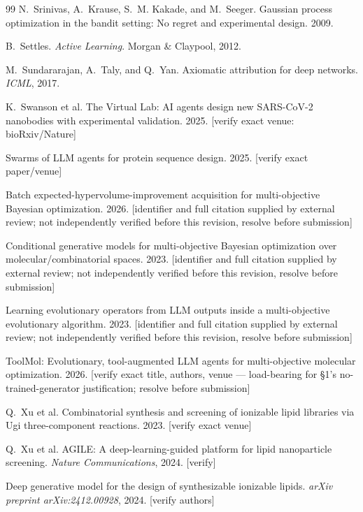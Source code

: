 \documentclass{article}
\begin{document}
\begin{thebibliography}{99}
 N.~Srinivas, A.~Krause,
S.~M. Kakade, and M.~Seeger. Gaussian process optimization in the bandit
setting: No regret and experimental design. 2009.

 B.~Settles. \emph{Active Learning}.
Morgan \& Claypool, 2012.

 M.~Sundararajan,
A.~Taly, and Q.~Yan. Axiomatic attribution for deep networks. \emph{ICML},
2017.

 K.~Swanson et al.
The Virtual Lab: AI agents design new SARS-CoV-2 nanobodies with
experimental validation. 2025. [verify exact venue: bioRxiv/Nature]

 Swarms of
LLM agents for protein sequence design. 2025. [verify exact paper/venue]

 Batch
expected-hypervolume-improvement acquisition for multi-objective Bayesian
optimization. 2026. [identifier and full citation supplied by external
review; not independently verified before this revision, resolve before
submission]

Conditional generative models for multi-objective Bayesian optimization
over molecular/combinatorial spaces. 2023. [identifier and full citation
supplied by external review; not independently verified before this
revision, resolve before submission]

 Learning
evolutionary operators from LLM outputs inside a multi-objective
evolutionary algorithm. 2023. [identifier and full citation supplied by
external review; not independently verified before this revision,
resolve before submission]

 ToolMol: Evolutionary,
tool-augmented LLM agents for multi-objective molecular optimization.
2026. [verify exact title, authors, venue --- load-bearing for \S1's
no-trained-generator justification; resolve before submission]

 Q.~Xu et al. Combinatorial synthesis
and screening of ionizable lipid libraries via Ugi three-component
reactions. 2023. [verify exact venue]

 Q.~Xu et al. AGILE: A
deep-learning-guided platform for lipid nanoparticle screening.
\emph{Nature Communications}, 2024. [verify]

 Deep generative model for
the design of synthesizable ionizable lipids. \emph{arXiv preprint
arXiv:2412.00928}, 2024. [verify authors]

\end{thebibliography}
\end{document}
